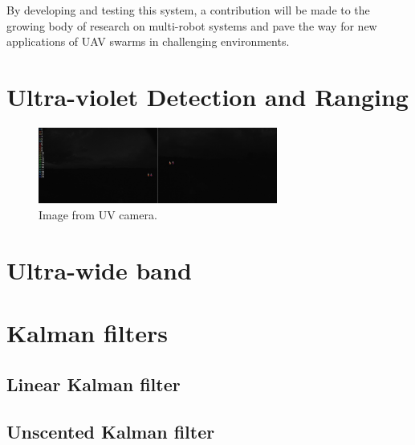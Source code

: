 \documentclass[twoside]{ctustyle/ctuthesis}
\theoremstyle{plain}
\theoremstyle{definition}
\theoremstyle{note}
\begin{document}
By developing and testing this system, a contribution will be made to
the growing body of research on multi-robot systems and pave the way for
new applications of UAV swarms in challenging environments.


\hypertarget{ultra-violet-detection-and-ranging}{%
\chapter{Ultra-violet Detection and
Ranging}\label{ultra-violet-detection-and-ranging}}

\begin{figure}

{\centering \includegraphics[width=0.7\textwidth,height=\textheight]{chapters/images/uvdar.jpg}

}

\caption{\label{fig-uvdar-img}Image from UV camera.}

\end{figure}


\hypertarget{ultra-wide-band}{%
\chapter{Ultra-wide band}\label{ultra-wide-band}}


\hypertarget{kalman-filters}{%
\chapter{Kalman filters}\label{kalman-filters}}

\hypertarget{linear-kalman-filter}{%
\section{Linear Kalman filter}\label{linear-kalman-filter}}

\hypertarget{unscented-kalman-filter}{%
\section{Unscented Kalman filter}\label{unscented-kalman-filter}}
\end{document}
